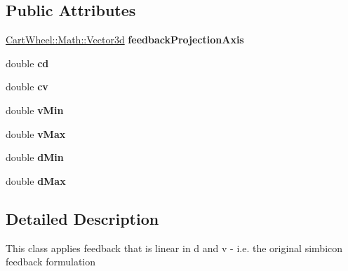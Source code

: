 \subsection*{Public Attributes}
\begin{DoxyCompactItemize}
\item 
\hypertarget{classCartWheel_1_1Core_1_1LinearBalanceFeedback_a1487ba18141b523686706f899e6b962f}{
\hyperlink{classCartWheel_1_1Math_1_1Vector3d}{CartWheel::Math::Vector3d} {\bfseries feedbackProjectionAxis}}
\label{classCartWheel_1_1Core_1_1LinearBalanceFeedback_a1487ba18141b523686706f899e6b962f}

\item 
\hypertarget{classCartWheel_1_1Core_1_1LinearBalanceFeedback_a057c1a70520358574481514fbdc17f72}{
double {\bfseries cd}}
\label{classCartWheel_1_1Core_1_1LinearBalanceFeedback_a057c1a70520358574481514fbdc17f72}

\item 
\hypertarget{classCartWheel_1_1Core_1_1LinearBalanceFeedback_ae5efb1fe9157850dc1df012fb67ff57f}{
double {\bfseries cv}}
\label{classCartWheel_1_1Core_1_1LinearBalanceFeedback_ae5efb1fe9157850dc1df012fb67ff57f}

\item 
\hypertarget{classCartWheel_1_1Core_1_1LinearBalanceFeedback_a598138940f6f161fca5b8f2acc01e504}{
double {\bfseries vMin}}
\label{classCartWheel_1_1Core_1_1LinearBalanceFeedback_a598138940f6f161fca5b8f2acc01e504}

\item 
\hypertarget{classCartWheel_1_1Core_1_1LinearBalanceFeedback_afcb4c397ab0ab981fcc99f210f57e7cf}{
double {\bfseries vMax}}
\label{classCartWheel_1_1Core_1_1LinearBalanceFeedback_afcb4c397ab0ab981fcc99f210f57e7cf}

\item 
\hypertarget{classCartWheel_1_1Core_1_1LinearBalanceFeedback_ab8ca762281bba9cc63b64630b6b336d9}{
double {\bfseries dMin}}
\label{classCartWheel_1_1Core_1_1LinearBalanceFeedback_ab8ca762281bba9cc63b64630b6b336d9}

\item 
\hypertarget{classCartWheel_1_1Core_1_1LinearBalanceFeedback_ad318867cb4b9c31ce9ef13893f8ac2dd}{
double {\bfseries dMax}}
\label{classCartWheel_1_1Core_1_1LinearBalanceFeedback_ad318867cb4b9c31ce9ef13893f8ac2dd}

\end{DoxyCompactItemize}


\subsection{Detailed Description}
This class applies feedback that is linear in d and v -\/ i.e. the original simbicon feedback formulation 

